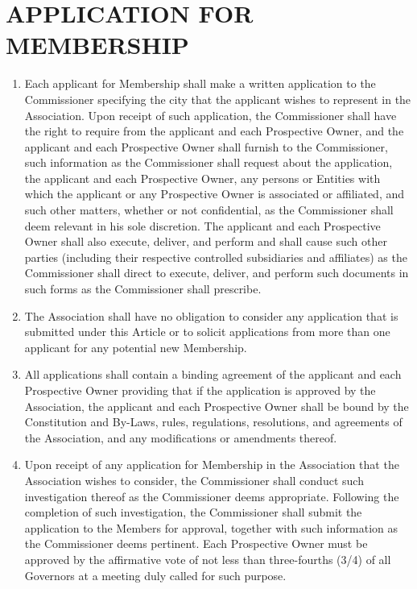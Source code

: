 \documentclass[]{book}
\providecommand{\tightlist}{%
  \setlength{\itemsep}{0pt}\setlength{\parskip}{0pt}}
\begin{document}
\begin{enumerate}
\end{enumerate}

\hypertarget{application-for-membership}{%
\section{APPLICATION FOR MEMBERSHIP}\label{application-for-membership}}

\begin{enumerate}
\def\labelenumi{(\alph{enumi})}
\tightlist
\item
  Each applicant for Membership shall make a written application to the Commissioner specifying the city that the applicant wishes to represent in the Association. Upon receipt of such application, the Commissioner shall have the right to require from the applicant and each Prospective Owner, and the applicant and each Prospective Owner shall furnish to the Commissioner, such information as the Commissioner shall request about the application, the applicant and each Prospective Owner, any persons or Entities with which the applicant or any Prospective Owner is associated or affiliated, and such other matters, whether or not confidential, as the Commissioner shall deem relevant in his sole discretion. The applicant and each Prospective Owner shall also execute, deliver, and perform and shall cause such other parties (including their respective controlled subsidiaries and affiliates) as the Commissioner shall direct to execute, deliver, and perform such documents in such forms as the Commissioner shall prescribe.
\item
  The Association shall have no obligation to consider any application that is submitted under this Article or to solicit applications from more than one applicant for any potential new Membership.
\item
  All applications shall contain a binding agreement of the applicant and each Prospective Owner providing that if the application is approved by the Association, the applicant and each Prospective Owner shall be bound by the Constitution and By-Laws, rules, regulations, resolutions, and agreements of the Association, and any modifications or amendments thereof.
\item
  Upon receipt of any application for Membership in the Association that the Association wishes to consider, the Commissioner shall conduct such investigation thereof as the Commissioner deems appropriate. Following the completion of such investigation, the Commissioner shall submit the application to the Members for approval, together with such information as the Commissioner deems pertinent. Each Prospective Owner must be approved by the affirmative vote of not less than three-fourths (3/4) of all Governors at a meeting duly called for such purpose.

\end{enumerate}
\end{document}
